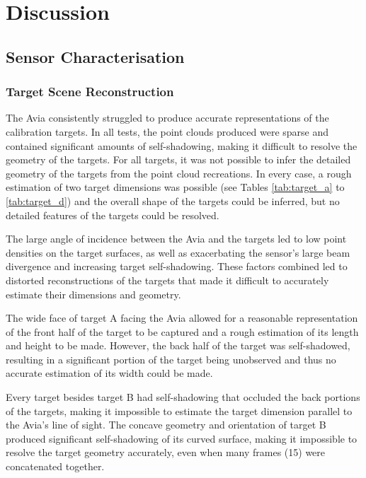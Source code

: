 \chapter{Discussion}
\label{ch:discussion}
\section{Sensor Characterisation}
\label{sec:ch8.section1}

\subsection{Target Scene Reconstruction}
\label{subsec:ch8.section1.subsec1}

The Avia consistently struggled to produce accurate representations of the calibration targets. In all tests, the point clouds produced were sparse and contained significant amounts of self-shadowing, making it difficult to resolve the geometry of the targets. For all targets, it was not possible to infer the detailed geometry of the targets from the point cloud recreations. In every case, a rough estimation of two target dimensions was possible (see Tables \ref{tab:target_a} to \ref{tab:target_d}) and the overall shape of the targets could be inferred, but no detailed features of the targets could be resolved.

The large angle of incidence between the Avia and the targets led to low point densities on the target surfaces, as well as exacerbating the sensor's large beam divergence and increasing target self-shadowing. These factors combined led to distorted reconstructions of the targets that made it difficult to accurately estimate their dimensions and geometry.

The wide face of target A facing the Avia allowed for a reasonable representation of the front half of the target to be captured and a rough estimation of its length and height to be made. However, the back half of the target was self-shadowed, resulting in a significant portion of the target being unobserved and thus no accurate estimation of its width could be made. 

Every target besides target B had self-shadowing that occluded the back portions of the targets, making it impossible to estimate the target dimension parallel to the Avia's line of sight. The concave geometry and orientation of target B produced significant self-shadowing of its curved surface, making it impossible to resolve the target geometry accurately, even when many frames (15) were concatenated together. 

